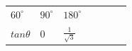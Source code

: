 {\begin{center}
\begin{xtabular*}{\mytablewidth}[t]{|p{10\mystarwidth}|p{10\mystarwidth}|p{10\mystarwidth}|p{10\mystarwidth}|p{10\mystarwidth}|p{10\mystarwidth}|p{10\mystarwidth}|}
                  \begin{math}{60}^{\circ }\end{math}
                 &
    
    
        
                  \begin{math}{90}^{\circ }\end{math}
                 &
    
    
        
                  \begin{math}{180}^{\circ }\end{math}
     \tabularnewline{}
    
    
        
                  \begin{math}tan\theta \end{math}
                 &
    
    
        0 &
    
    
        
                  \begin{math}\frac{1}{\sqrt{3}}\end{math}
                 &
    

\end{xtabular*}
\end{center}}
